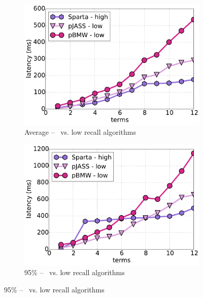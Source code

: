 {{\begin{figure}[tbh]
    
          \begin{subfigure}[t]{0.4\textwidth}
         \includegraphics[width=\textwidth]{figures/latency_high_low_12threads_clueweb.pdf}
        \caption{Average\bigdataset{, \cw} -- \alg\ vs. low recall algorithms}
        \label{fig:terms-scaling-low-avg}
      \end{subfigure}%
	\begin{subfigure}[t]{0.4\textwidth}
    	\includegraphics[width=\textwidth]{figures/latency_95th_percentile_high_low_clueweb.pdf}
	\caption{95\%\bigdataset{, \cw} -- \alg\ vs. low recall algorithms}
	\label{fig:terms-scaling-low-95}
    \end{subfigure}
    

\end{figure}}}
